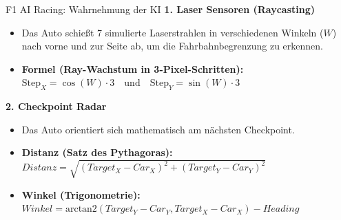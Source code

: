 \documentclass[aspectratio=169]{beamer}
\begin{document}
\begin{frame}{F1 AI Racing: Wahrnehmung der KI}
\textbf{1. Laser Sensoren (Raycasting)}
\begin{itemize}
    \item Das Auto schießt 7 simulierte Laserstrahlen in verschiedenen Winkeln ($W$) nach vorne und zur Seite ab, um die Fahrbahnbegrenzung zu erkennen.
    \item \textbf{Formel (Ray-Wachstum in 3-Pixel-Schritten):}\\
    $\text{Step}_X = \cos(W) \cdot 3 \quad \text{und} \quad \text{Step}_Y = \sin(W) \cdot 3$
\end{itemize}

\vspace{0.3cm}
\textbf{2. Checkpoint Radar}
\begin{itemize}
    \item Das Auto orientiert sich mathematisch am nächsten Checkpoint.
    \item \textbf{Distanz (Satz des Pythagoras):}\\
    $Distanz = \sqrt{(Target_X - Car_X)^2 + (Target_Y - Car_Y)^2}$
    \item \textbf{Winkel (Trigonometrie):}\\
    $Winkel = \text{arctan2}(Target_Y - Car_Y, Target_X - Car_X) - Heading$
\end{itemize}
\end{frame}
\end{document}
